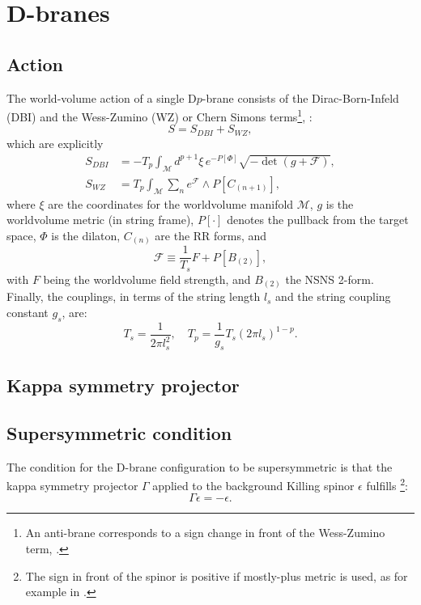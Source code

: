 \section{D-branes}\label{sec:Dbranes}

\subsection{Action}
The world-volume action of a single D$p$-brane consists of the Dirac-Born-Infeld (DBI) and the Wess-Zumino (WZ) or Chern Simons terms\footnote{An anti-brane corresponds to a sign change in front of the Wess-Zumino term, \cite{Kruczenski:2003be}.},
\cite{Ammon:2015wua}:
\begin{equation}
 S = S_{DBI} + S_{WZ},
\end{equation}
which are explicitly
\begin{align}
 S_{DBI} & = 
 -T_p \int_\mathcal{M} d^{p+1}\xi \, e^{-P[\Phi] } \sqrt{-\det (g+\mathcal{F})},\\
 S_{WZ} & =
 T_p\int _\mathcal{M} \sum_n e^{\mathcal{F}}\wedge P[C_{(n+1)}],
\end{align}
where $\xi$ are the coordinates for the worldvolume manifold $\mathcal{M}$, $g$ is the worldvolume metric (in string frame), $P[\cdot]$ denotes the pullback from the target space, $\Phi$ is the dilaton, $C_{(n)}$ are the RR forms, and
\begin{equation}
 \mathcal{F} \equiv \frac{1}{T_s} F + P[B_{(2)}], 
\end{equation}
with $F$ being the worldvolume field strength, and $B_{(2)}$ the NSNS 2-form. Finally, the couplings, in terms of the string length $l_s$ and the string coupling constant $g_s$, are:
\begin{equation}
 T_{s} = \dfrac{1}{2\pi l_s^2}, \quad T_p = \dfrac{1}{g_s} T_s (2\pi l_s)^{1-p}.
\end{equation}


\subsection{Kappa symmetry projector}



\subsection{Supersymmetric condition}
The condition for the D-brane configuration to be supersymmetric is that the kappa symmetry projector $\Gamma$ applied to the background Killing spinor $\epsilon$ fulfills
\footnote{The sign in front of the spinor is positive if mostly-plus metric is used, as for example in \cite{Skenderis:2002vf}.}:
\begin{equation} \label{eq:susyCondition}
 \Gamma \epsilon = - \epsilon.
\end{equation}

